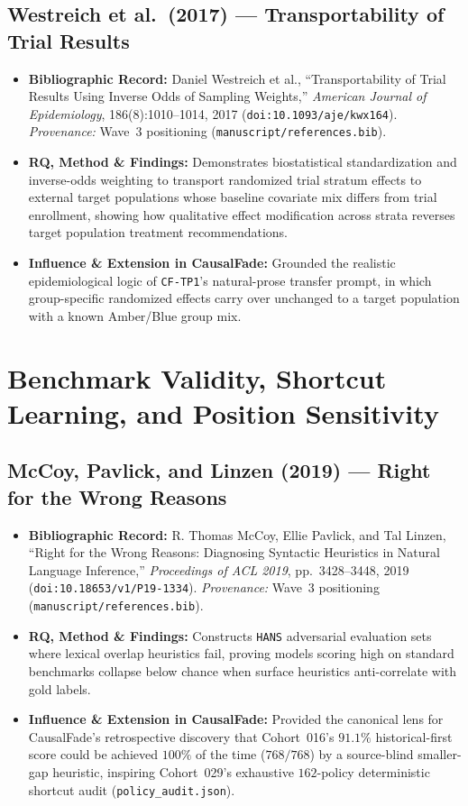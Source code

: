 \subsection{Westreich et al.\ (2017) --- Transportability of Trial Results \citep{westreich2017transportability}}
\begin{itemize}
  \item \textbf{Bibliographic Record:} Daniel Westreich et al., ``Transportability of Trial Results Using Inverse Odds of Sampling Weights,'' \emph{American Journal of Epidemiology}, 186(8):1010--1014, 2017 (\texttt{doi:10.1093/aje/kwx164}). \emph{Provenance:} Wave~3 positioning (\texttt{manuscript/references.bib}).
  \item \textbf{RQ, Method \& Findings:} Demonstrates biostatistical standardization and inverse-odds weighting to transport randomized trial stratum effects to external target populations whose baseline covariate mix differs from trial enrollment, showing how qualitative effect modification across strata reverses target population treatment recommendations.
  \item \textbf{Influence \& Extension in CausalFade:} Grounded the realistic epidemiological logic of \texttt{CF-TP1}'s natural-prose transfer prompt, in which group-specific randomized effects carry over unchanged to a target population with a known Amber/Blue group mix.
\end{itemize}

\section{Benchmark Validity, Shortcut Learning, and Position Sensitivity}

\subsection{McCoy, Pavlick, and Linzen (2019) --- Right for the Wrong Reasons \citep{mccoy2019right}}
\begin{itemize}
  \item \textbf{Bibliographic Record:} R. Thomas McCoy, Ellie Pavlick, and Tal Linzen, ``Right for the Wrong Reasons: Diagnosing Syntactic Heuristics in Natural Language Inference,'' \emph{Proceedings of ACL 2019}, pp.~3428--3448, 2019 (\texttt{doi:10.18653/v1/P19-1334}). \emph{Provenance:} Wave~3 positioning (\texttt{manuscript/references.bib}).
  \item \textbf{RQ, Method \& Findings:} Constructs \texttt{HANS} adversarial evaluation sets where lexical overlap heuristics fail, proving models scoring high on standard benchmarks collapse below chance when surface heuristics anti-correlate with gold labels.
  \item \textbf{Influence \& Extension in CausalFade:} Provided the canonical lens for CausalFade's retrospective discovery that Cohort~016's $91.1\%$ historical-first score could be achieved $100\%$ of the time ($768/768$) by a source-blind smaller-gap heuristic, inspiring Cohort~029's exhaustive $162$-policy deterministic shortcut audit (\texttt{policy\_audit.json}).
\end{itemize}

